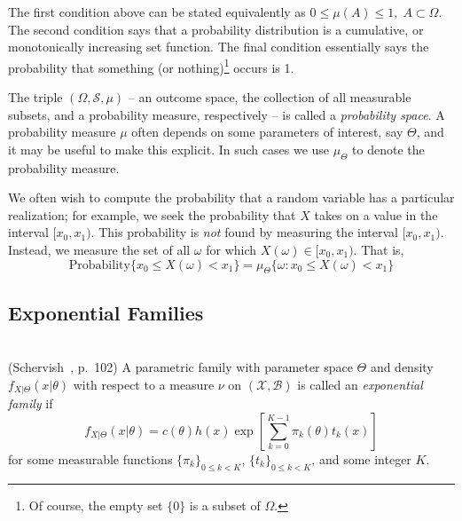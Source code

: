 The first condition above can be stated equivalently as $0 \leq \mu(A)
\leq 1, \; A \subset \varOmega$.  The second condition says
that a probability distribution is a cumulative, or
monotonically increasing set function.
The final condition essentially says the probability
that something (or nothing)\footnote{Of course, the empty set
  $\{0\}$ is a subset of $\varOmega$.} occurs is 1. 


The triple $(\varOmega, \mathcal{S}, \mu)$ -- an outcome space, the
collection of all measurable subsets, and a probability measure,
respectively -- is called a \emph{probability space}.   
A probability measure $\mu$ often depends on some
parameters of interest, say $\Theta$, and it may be useful
to make this explicit. In such cases we use $\mu_{\Theta}$
to denote the probability measure.    

We often wish to compute the probability that a random variable has a
particular realization; for example, we seek the probability that
$X$ takes on a value in the interval $[x_0, x_1)$.  This probability
is \emph{not} found by measuring the interval $[x_0, x_1)$.  Instead,
we measure the set of all $\omega$ for which $X(\omega) \in [x_0, x_1)$.  That is,
\[
\text{Probability}\{x_0 \leq X(\omega) < x_1\} = \mu_{\Theta}\{\omega : x_0 \leq X(\omega) < x_1\}
\]

\subsection{Exponential Families}
\begin{definition}\label{def:expfam}\\
(Schervish~\cite{Schervish:1995}, p.~102) A parametric
family with parameter space $\varTheta$ and density
$f_{X|\Theta}(x|\theta)$ with respect to a measure 
$\nu$ on $(\mathcal{X}, \mathcal{B})$ is called an
{\it exponential family} if
\begin{equation}\label{eq:expfam}
f_{X|\Theta}(x|\theta) = 
c(\theta)h(x)\exp\left[\sum_{k=0}^{K-1}\pi_k(\theta)t_k(x)\right]
\end{equation}
for some measurable functions $\{\pi_k\}_{0\leq k < K}$, 
$\{t_k\}_{0\leq k < K}$, and some integer $K$.
\end{definition}

